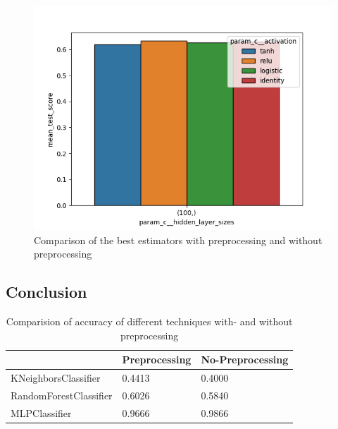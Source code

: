 \begin{figure}[H]
  \begin{center}
    \includegraphics[width=\linewidth]{amazon/plots/mlp_comparison.png}
    \caption{Comparison of the best estimators with preprocessing and without preprocessing}
    \label{fig:mlp-comparison}
  \end{center}
\end{figure}

\subsection{Conclusion}



\begin{table}[H]
\begin{center}
\begin{tabular}{|l|l|l|}
\hline
                       & Preprocessing & No-Preprocessing \\ \hline
KNeighborsClassifier   & 0.4413        & 0.4000           \\ \hline
RandomForestClassifier & 0.6026        & 0.5840           \\ \hline
MLPClassifier          & 0.9666        & 0.9866           \\ \hline
\end{tabular}
\caption{Comparision of accuracy of different techniques with- and without preprocessing}
\end{center}
\end{table}

